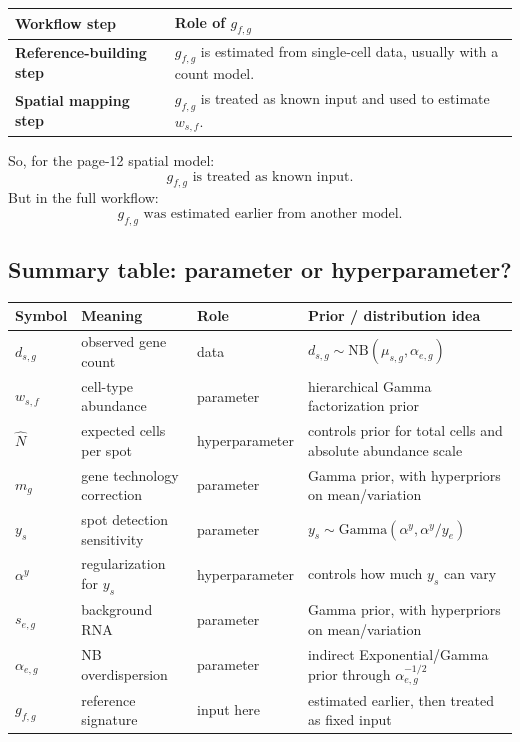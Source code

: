 \documentclass[11pt]{article}
\newcommand{\NB}{\mathrm{NB}}
\begin{document}
\begin{center}
\begin{tabularx}{0.95\textwidth}{>{\bfseries}p{}X}
\toprule
Workflow step & Role of $g_{f,g}$ \\
\midrule
Reference-building step & $g_{f,g}$ is estimated from single-cell data, usually with a count model. \\
Spatial mapping step & $g_{f,g}$ is treated as known input and used to estimate $w_{s,f}$. \\
\bottomrule
\end{tabularx}
\end{center}

So, for the page-12 spatial model:
\[
g_{f,g}\text{ is treated as known input.}
\]
But in the full workflow:
\[
g_{f,g}\text{ was estimated earlier from another model.}
\]

\subsection{Summary table: parameter or hyperparameter?}

\begin{center}
\small
\begin{tabularx}{0.98\textwidth}{>{\bfseries}p{}p{}p{}X}
\toprule
Symbol & Meaning & Role & Prior / distribution idea \\
\midrule
$d_{s,g}$ & observed gene count & data & $d_{s,g}\sim \NB(\mu_{s,g},\alpha_{e,g})$ \\
$w_{s,f}$ & cell-type abundance & parameter & hierarchical Gamma factorization prior \\
$\hat N$ & expected cells per spot & hyperparameter & controls prior for total cells and absolute abundance scale \\
$m_g$ & gene technology correction & parameter & Gamma prior, with hyperpriors on mean/variation \\
$y_s$ & spot detection sensitivity & parameter & $y_s\sim \mathrm{Gamma}(\alpha^y,\alpha^y/y_e)$ \\
$\alpha^y$ & regularization for $y_s$ & hyperparameter & controls how much $y_s$ can vary \\
$s_{e,g}$ & background RNA & parameter & Gamma prior, with hyperpriors on mean/variation \\
$\alpha_{e,g}$ & NB overdispersion & parameter & indirect Exponential/Gamma prior through $\alpha_{e,g}^{-1/2}$ \\
$g_{f,g}$ & reference signature & input here & estimated earlier, then treated as fixed input \\
\bottomrule
\end{tabularx}
\end{center}
\end{document}
